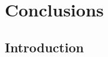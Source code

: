 \documentclass[twoside,12pt, a4paper]{report}
\begin{document}
\chapter{Conclusions}


\begin{appendices}

\chapter{Introduction}
\label{appendix_introduction}


\end{appendices}

\clearpage %
\printbibliography[heading=bibintoc,title=References]
\end{document}
